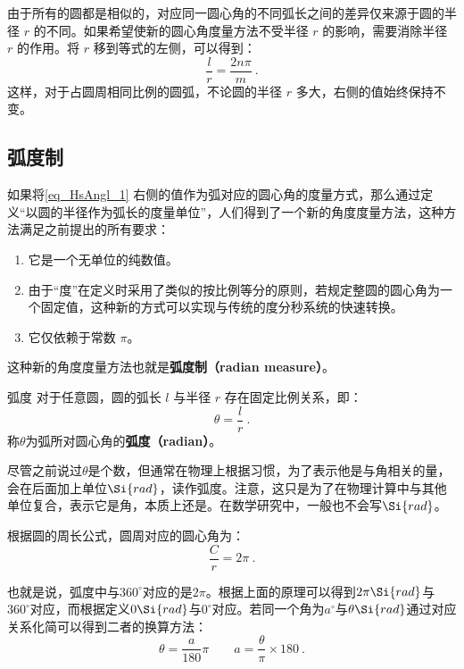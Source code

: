 由于所有的圆都是相似的，对应同一圆心角的不同弧长之间的差异仅来源于圆的半径 $r$ 的不同。如果希望使新的圆心角度量方法不受半径 $r$ 的影响，需要消除半径 $r$ 的作用。将 $r$ 移到等式的左侧，可以得到：
\begin{equation}\label{eq_HsAngl_1}
\frac{l}{r}=\frac{2n\pi}{m}~.
\end{equation}
这样，对于占圆周相同比例的圆弧，不论圆的半径 $r$ 多大，右侧的值始终保持不变。

\subsection{弧度制}

如果将\autoref{eq_HsAngl_1} 右侧的值作为弧对应的圆心角的度量方式，那么通过定义“以圆的半径作为弧长的度量单位”，人们得到了一个新的角度度量方法，这种方法满足之前提出的所有要求：
\begin{enumerate}
\item 它是一个无单位的纯数值。
\item 由于“度”在定义时采用了类似的按比例等分的原则，若规定整圆的圆心角为一个固定值，这种新的方式可以实现与传统的度分秒系统的快速转换。
\item 它仅依赖于常数 $\pi$。
\end{enumerate}
这种新的角度度量方法也就是\textbf{弧度制（radian measure）}。

\begin{definition}{弧度}
对于任意圆，圆的弧长 $l$ 与半径 $r$ 存在固定比例关系，即：
\begin{equation}
\theta  = \frac{l}{r}~.
\end{equation}
称$\theta$为弧所对圆心角的\textbf{弧度（radian）}。
\end{definition}

尽管之前说过$\theta$是个数，但通常在物理上根据习惯，为了表示他是与角相关的量，会在后面加上单位$\Si{rad}$，读作弧度。注意，这只是为了在物理计算中与其他单位复合，表示它是角，本质上还是。在数学研究中，一般也不会写$\Si{rad}$。

根据圆的周长公式，圆周对应的圆心角为：
\begin{equation}
\frac{C}{r}=2\pi~.
\end{equation}



也就是说，弧度中与$360^\circ$对应的是$2\pi$。根据上面的原理可以得到$2\pi\Si{rad}$与$360^\circ$对应，而根据定义$0\Si{rad}$与$0^\circ$对应。若同一个角为$a^\circ$与$\theta\Si{rad}$通过对应关系化简可以得到二者的换算方法：
\begin{equation}
\theta=\frac{a}{180}\pi\qquad a=\frac{\theta}{\pi}\times180~.
\end{equation}

